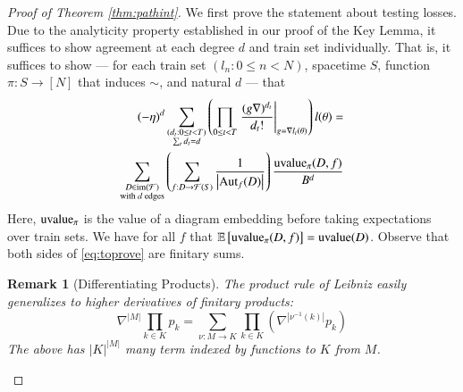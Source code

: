\documentclass[anon,12pt]{colt2021} %
\newtheorem{rmk}{Remark}
\newcommand{\wrap}[1]{\left(#1\right)}
\newcommand{\wabs}[1]{\left|#1\right|}
\newcommand{\Free}{\mathcal{F}}
\newcommand{\Aut}{\text{\textnormal{Aut}}}
\newcommand{\image}{\text{\textnormal{im}}}
\newcommand{\uvalue}{\text{\textnormal{uvalue}}}
\newcommand{\expct}[1]{\mathbb{E}\left[#1\right]}
\begin{document}
        \begin{proof}[Proof of Theorem \ref{thm:pathint}]
            We first prove the statement about testing losses.
            Due to the analyticity property established in our proof of the
            Key Lemma, it suffices to show agreement at each degree $d$ and
            train set individually.  That is, it suffices to show --- for
            each train set $(l_n: 0\leq n<N)$, spacetime $S$, function $\pi:
            S\to [N]$ that induces $\sim$, and natural $d$ --- that
            \begin{align} \label{eq:toprove}
                (-\eta)^d
                \sum_{\substack{
                    (d_t: 0\leq t<T) \\
                    \sum_t d_t = d
                }}
                \wrap{
                    \prod_{0 \leq t < T} \left.
                        \frac{(g \nabla)^{d_t}}{d_t!}
                    \right|_{g=\nabla l_t(\theta)}
                } l (\theta)
                = \nonumber \\
                \sum_{\substack{
                    D \in \image(\Free) \\
                    \textnormal{with $d$ edges}
                }}
                \wrap{
                    \sum_{f: D\to\Free(S)}
                    \frac{1}{\wabs{\Aut_f(D)}}
                }
                \frac{\uvalue_\pi(D, f)}{B^{d}}
            \end{align}
            Here, $\uvalue_\pi$ is the value of a diagram embedding before
            taking expectations over train sets.  We have for all $f$ that
            $\expct{\uvalue_\pi(D, f)} = \uvalue(D)$.
            Observe that both sides of \ref{eq:toprove} are finitary sums.

            \begin{rmk}[Differentiating Products] \label{rmk:leibniz}
                The product rule of Leibniz easily generalizes to higher
                derivatives of finitary products:
                $$
                    \nabla^{\wabs{M}} \prod_{k \in K} p_k
                    = 
                    \sum_{\nu:M\to K} \prod_{k\in K} \wrap{
                        \nabla^{\wabs{\nu^{-1}(k)}} p_k
                    }
                $$
                The above has $\wabs{K}^{\wabs{M}}$ many term indexed by
                functions to $K$ from $M$.
            \end{rmk}


\end{proof}
\end{document}
